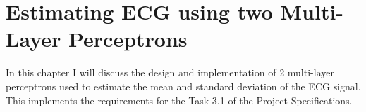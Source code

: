 \chapter{Estimating ECG using two Multi-Layer Perceptrons}\label{ch:ecg}

In this chapter I will discuss the design and implementation of 2 multi-layer
perceptrons used to estimate the mean and standard deviation of the ECG signal.
This implements the requirements for the Task 3.1 of the Project
Specifications.




